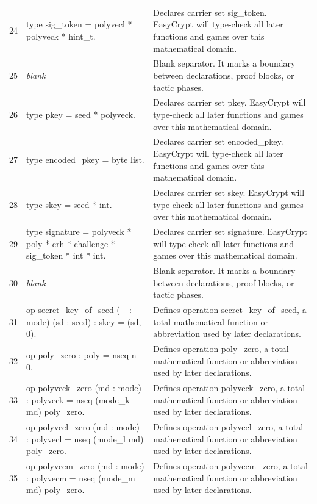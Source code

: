 \documentclass[10pt]{article}
\begin{document}
\begin{longtable}{r L{0.53\textwidth} L{0.37\textwidth}}
24 & {\ttfamily\scriptsize type sig\_token = polyvecl * polyveck * hint\_t.} & Declares carrier set sig\_token.  EasyCrypt will type-check all later functions and games over this mathematical domain. \\
25 & {\ttfamily\scriptsize \emph{blank}} & Blank separator.  It marks a boundary between declarations, proof blocks, or tactic phases. \\
26 & {\ttfamily\scriptsize type pkey = seed * polyveck.} & Declares carrier set pkey.  EasyCrypt will type-check all later functions and games over this mathematical domain. \\
27 & {\ttfamily\scriptsize type encoded\_pkey = byte list.} & Declares carrier set encoded\_pkey.  EasyCrypt will type-check all later functions and games over this mathematical domain. \\
28 & {\ttfamily\scriptsize type skey = seed * int.} & Declares carrier set skey.  EasyCrypt will type-check all later functions and games over this mathematical domain. \\
29 & {\ttfamily\scriptsize type signature = polyveck * poly * crh * challenge * sig\_token * int * int.} & Declares carrier set signature.  EasyCrypt will type-check all later functions and games over this mathematical domain. \\
30 & {\ttfamily\scriptsize \emph{blank}} & Blank separator.  It marks a boundary between declarations, proof blocks, or tactic phases. \\
31 & {\ttfamily\scriptsize op secret\_key\_of\_seed (\_ : mode) (sd : seed) : skey = (sd, 0).} & Defines operation secret\_key\_of\_seed, a total mathematical function or abbreviation used by later declarations. \\
32 & {\ttfamily\scriptsize op poly\_zero : poly = nseq n 0.} & Defines operation poly\_zero, a total mathematical function or abbreviation used by later declarations. \\
33 & {\ttfamily\scriptsize op polyveck\_zero (md : mode) : polyveck = nseq (mode\_k md) poly\_zero.} & Defines operation polyveck\_zero, a total mathematical function or abbreviation used by later declarations. \\
34 & {\ttfamily\scriptsize op polyvecl\_zero (md : mode) : polyvecl = nseq (mode\_l md) poly\_zero.} & Defines operation polyvecl\_zero, a total mathematical function or abbreviation used by later declarations. \\
35 & {\ttfamily\scriptsize op polyvecm\_zero (md : mode) : polyvecm = nseq (mode\_m md) poly\_zero.} & Defines operation polyvecm\_zero, a total mathematical function or abbreviation used by later declarations. \\

\end{longtable}
\end{document}
